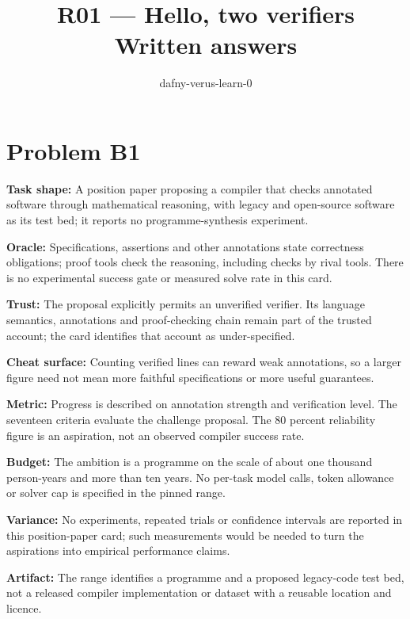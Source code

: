\documentclass[11pt]{article}
\title{R01 --- Hello, two verifiers \\ \large Written answers}
\author{dafny-verus-learn-0}
\date{}
\begin{document}
\maketitle
\section*{Problem B1}\label{ans:B1}
\begin{answer}
\textbf{Task shape:} A position paper proposing a compiler that checks annotated software through mathematical reasoning, with legacy and open-source software as its test bed; it reports no programme-synthesis experiment.

\textbf{Oracle:} Specifications, assertions and other annotations state correctness obligations; proof tools check the reasoning, including checks by rival tools. There is no experimental success gate or measured solve rate in this card.

\textbf{Trust:} The proposal explicitly permits an unverified verifier. Its language semantics, annotations and proof-checking chain remain part of the trusted account; the card identifies that account as under-specified.

\textbf{Cheat surface:} Counting verified lines can reward weak annotations, so a larger figure need not mean more faithful specifications or more useful guarantees.

\textbf{Metric:} Progress is described on annotation strength and verification level. The seventeen criteria evaluate the challenge proposal. The 80 percent reliability figure is an aspiration, not an observed compiler success rate.

\textbf{Budget:} The ambition is a programme on the scale of about one thousand person-years and more than ten years. No per-task model calls, token allowance or solver cap is specified in the pinned range.

\textbf{Variance:} No experiments, repeated trials or confidence intervals are reported in this position-paper card; such measurements would be needed to turn the aspirations into empirical performance claims.

\textbf{Artifact:} The range identifies a programme and a proposed legacy-code test bed, not a released compiler implementation or dataset with a reusable location and licence.
\end{answer}
\end{document}
